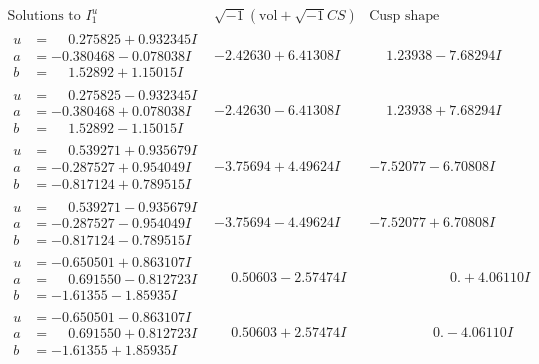 \documentclass[1p]{elsarticle_modified}
\theoremstyle{definition}
\newcommand{\I}{\sqrt{-1}}
\begin{document}
$$\begin{array}{c|c|c}  
\text{Solutions to }I^u_{1}& \I (\text{vol} + \sqrt{-1}CS) & \text{Cusp shape}\\
 \hline 
\begin{aligned}
u &= \phantom{-}0.275825 + 0.932345 I \\
a &= -0.380468 - 0.078038 I \\
b &= \phantom{-}1.52892 + 1.15015 I\end{aligned}
 & -2.42630 + 6.41308 I & \phantom{-}1.23938 - 7.68294 I \\ \hline\begin{aligned}
u &= \phantom{-}0.275825 - 0.932345 I \\
a &= -0.380468 + 0.078038 I \\
b &= \phantom{-}1.52892 - 1.15015 I\end{aligned}
 & -2.42630 - 6.41308 I & \phantom{-}1.23938 + 7.68294 I \\ \hline\begin{aligned}
u &= \phantom{-}0.539271 + 0.935679 I \\
a &= -0.287527 + 0.954049 I \\
b &= -0.817124 + 0.789515 I\end{aligned}
 & -3.75694 + 4.49624 I & -7.52077 - 6.70808 I \\ \hline\begin{aligned}
u &= \phantom{-}0.539271 - 0.935679 I \\
a &= -0.287527 - 0.954049 I \\
b &= -0.817124 - 0.789515 I\end{aligned}
 & -3.75694 - 4.49624 I & -7.52077 + 6.70808 I \\ \hline\begin{aligned}
u &= -0.650501 + 0.863107 I \\
a &= \phantom{-}0.691550 - 0.812723 I \\
b &= -1.61355 - 1.85935 I\end{aligned}
 & \phantom{-}0.50603 - 2.57474 I & \phantom{-0.000000 -}0. + 4.06110 I \\ \hline\begin{aligned}
u &= -0.650501 - 0.863107 I \\
a &= \phantom{-}0.691550 + 0.812723 I \\
b &= -1.61355 + 1.85935 I\end{aligned}
 & \phantom{-}0.50603 + 2.57474 I & \phantom{-0.000000 } 0. - 4.06110 I \\ \hline\begin{aligned}

\end{aligned}
\end{array}$$
\end{document}
